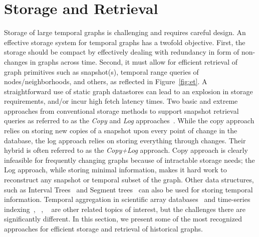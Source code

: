 \documentclass{svjour3}
\begin{document}


\section{Storage and Retrieval}

Storage of large temporal graphs is challenging and requires careful design. An effective storage system for temporal graphs has a twofold objective. First, the storage should be compact by effectively dealing with redundancy in form of non-changes in graphs across time. Second, it must allow for efficient retrieval of graph primitives such as snapshot(s), temporal range queries of nodes/neighborhoods, and others, as reflected in Figure~\ref{fig:et}. A straightforward use of static graph datastores can lead to an explosion in storage requirements, and/or incur high fetch latency times.  
Two basic and extreme approaches from conventional storage methods 
to support snapshot retrieval queries as referred to as the \textit{Copy} and \textit{Log} approaches~\cite{Salzberg1999}. While the copy approach relies on storing new copies of a snapshot upon every point of change in the database, the log approach relies on storing everything through changes. Their hybrid is often referred to as the \textit{Copy+Log} approach. Copy approach is clearly infeasible for frequently changing graphs because of intractable storage needs; the Log approach, while storing minimal information, makes it hard work to reconstruct any snapshot or temporal subset of the graph. %
Other data structures, such as Interval Trees~\cite{Arge1996} and Segment trees~\cite{Blankenagel1994} can also be used for storing temporal information. Temporal aggregation in scientific array databases~\cite{soroush2013time} and time-series indexing~\cite{niennattrakul2010exact}, ~\cite{camerra2013beyond}, ~\cite{wang2013experimental} are other related topics of interest, but the challenges there are significantly different. In this section, we present some of the most recognized approaches for efficient storage and retrieval of historical graphs.
\end{document}
